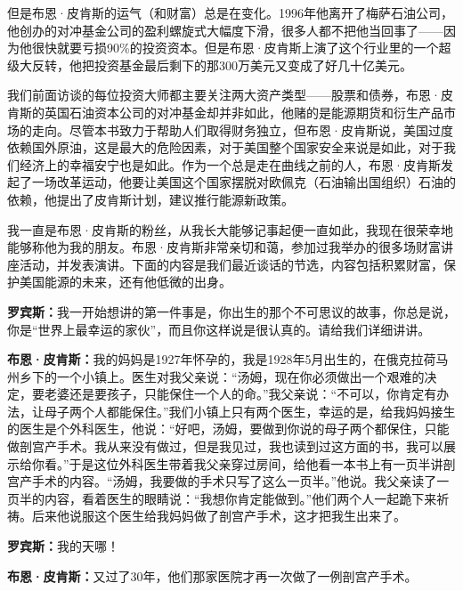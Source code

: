 但是布恩·皮肯斯的运气（和财富）总是在变化。1996年他离开了梅萨石油公司，他创办的对冲基金公司的盈利螺旋式大幅度下滑，很多人都不把他当回事了——因为他很快就要亏损90\%的投资资本。但是布恩·皮肯斯上演了这个行业里的一个超级大反转，他把投资基金最后剩下的那300万美元又变成了好几十亿美元。

我们前面访谈的每位投资大师都主要关注两大资产类型——股票和债券，布恩·皮肯斯的英国石油资本公司的对冲基金却并非如此，他赌的是能源期货和衍生产品市场的走向。尽管本书致力于帮助人们取得财务独立，但布恩·皮肯斯说，美国过度依赖国外原油，这是最大的危险因素，对于美国整个国家安全来说是如此，对于我们经济上的幸福安宁也是如此。作为一个总是走在曲线之前的人，布恩·皮肯斯发起了一场改革运动，他要让美国这个国家摆脱对欧佩克（石油输出国组织）石油的依赖，他提出了皮肯斯计划，建议推行能源新政策。

我一直是布恩·皮肯斯的粉丝，从我长大能够记事起便一直如此，我现在很荣幸地能够称他为我的朋友。布恩·皮肯斯非常亲切和蔼，参加过我举办的很多场财富讲座活动，并发表演讲。下面的内容是我们最近谈话的节选，内容包括积累财富，保护美国能源的未来，还有他低微的出身。

\begin{BookQuote}
\textbf{罗宾斯：}我一开始想讲的第一件事是，你出生的那个不可思议的故事，你总是说，你是“世界上最幸运的家伙”，而且你这样说是很认真的。请给我们详细讲讲。
\end{BookQuote}

\begin{BookQuote}
\textbf{布恩·皮肯斯：}我的妈妈是1927年怀孕的，我是1928年5月出生的，在俄克拉荷马州乡下的一个小镇上。医生对我父亲说：“汤姆，现在你必须做出一个艰难的决定，要老婆还是要孩子，只能保住一个人的命。”我父亲说：“不可以，你肯定有办法，让母子两个人都能保住。”我们小镇上只有两个医生，幸运的是，给我妈妈接生的医生是个外科医生，他说：“好吧，汤姆，要做到你说的母子两个都保住，只能做剖宫产手术。我从来没有做过，但是我见过，我也读到过这方面的书，我可以展示给你看。”于是这位外科医生带着我父亲穿过房间，给他看一本书上有一页半讲剖宫产手术的内容。“汤姆，我要做的手术只写了这么一页半。”他说。我父亲读了一页半的内容，看着医生的眼睛说：“我想你肯定能做到。”他们两个人一起跪下来祈祷。后来他说服这个医生给我妈妈做了剖宫产手术，这才把我生出来了。
\end{BookQuote}

\begin{BookQuote}
\textbf{罗宾斯：}我的天哪！
\end{BookQuote}

\begin{BookQuote}
\textbf{布恩·皮肯斯：}又过了30年，他们那家医院才再一次做了一例剖宫产手术。
\end{BookQuote}

